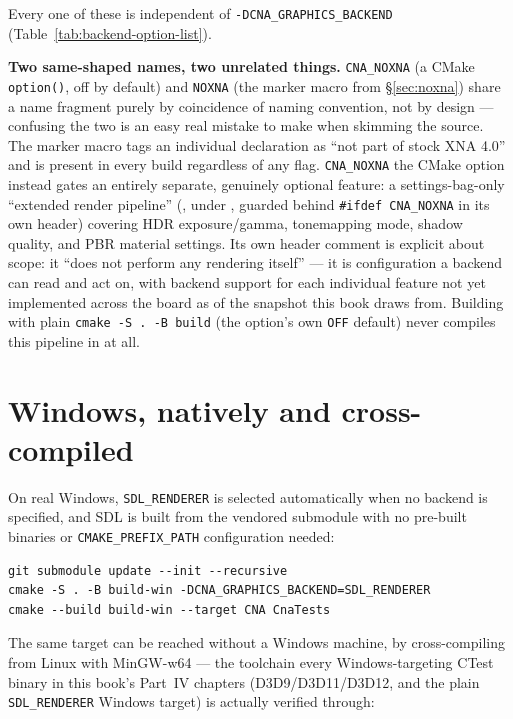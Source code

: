 Every one of these is independent of \texttt{-DCNA\_GRAPHICS\_BACKEND}
(Table~\ref{tab:backend-option-list}).

\begin{sourcenote}
\textbf{Two same-shaped names, two unrelated things.} \texttt{CNA\_NOXNA} (a CMake
\texttt{option()}, off by default) and \texttt{NOXNA} (the marker macro from
\S\ref{sec:noxna}) share a name fragment purely by coincidence of naming convention, not by
design --- confusing the two is an easy real mistake to make when skimming the source. The
marker macro tags an individual declaration as ``not part of stock XNA 4.0'' and is present in
every build regardless of any flag. \texttt{CNA\_NOXNA} the CMake option instead gates an
entirely separate, genuinely optional feature: a settings-bag-only ``extended render
pipeline'' (, under , guarded behind
\texttt{\#ifdef CNA\_NOXNA} in its own header) covering HDR exposure/gamma, tonemapping mode,
shadow quality, and PBR material settings. Its own header comment is explicit about scope:
it ``does not perform any rendering itself'' --- it is configuration a backend can read and
act on, with backend support for each individual feature not yet implemented across the board
as of the snapshot this book draws from. Building with plain \texttt{cmake -S . -B build}
(the option's own \texttt{OFF} default) never compiles this pipeline in at all.
\end{sourcenote}

\section{Windows, natively and cross-compiled}

On real Windows, \texttt{SDL\_RENDERER} is selected automatically when no backend is
specified, and SDL is built from the vendored submodule with no pre-built binaries or
\texttt{CMAKE\_PREFIX\_PATH} configuration needed:

\begin{lstlisting}[style=cnashell]
git submodule update --init --recursive
cmake -S . -B build-win -DCNA_GRAPHICS_BACKEND=SDL_RENDERER
cmake --build build-win --target CNA CnaTests
\end{lstlisting}

The same target can be reached without a Windows machine, by cross-compiling from Linux with
MinGW-w64 --- the toolchain every Windows-targeting CTest binary in this book's Part~IV
chapters (D3D9/D3D11/D3D12, and the plain \texttt{SDL\_RENDERER} Windows target) is actually
verified through:


